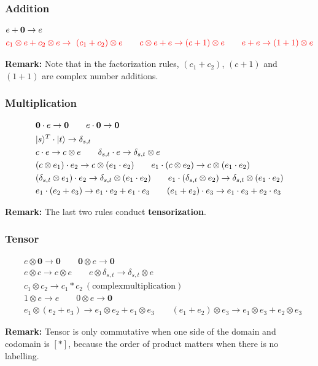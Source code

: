 \subsubsection*{Addition}
\begin{align*}
  & e + \textbf{0}\to e\\
  & \textcolor{red}{c_1 \otimes e + c_2 \otimes e \to \ (c_1 + c_2) \otimes e 
  \qquad c \otimes e + e \to (c + 1) \otimes e
  \qquad e + e \to (1 + 1) \otimes e}
\end{align*}

\textbf{Remark:} Note that in the factorization rules, $(c_1 + c_2)$, $(c + 1)$ and $(1 + 1)$ are complex number additions.


\subsubsection*{Multiplication}
\begin{align*}
  & \textbf{0} \cdot e \to \textbf{0}
  \qquad 
  e \cdot \textbf{0} \to \textbf{0}\\
  & |s\rangle^T \cdot |t\rangle \to \delta_{s, t}\\
  & c \cdot e \to c \otimes e 
  \qquad \delta_{s, t} \cdot e \to \delta_{s, t} \otimes e\\
  & (c \otimes e_1) \cdot e_2 \to c \otimes (e_1 \cdot e_2)
  \qquad e_1 \cdot (c \otimes e_2) \to c \otimes (e_1 \cdot e_2) \\
  & (\delta_{s, t} \otimes e_1) \cdot e_2 \to \delta_{s, t} \otimes (e_1 \cdot e_2)
  \qquad e_1 \cdot (\delta_{s, t} \otimes e_2) \to \delta_{s, t} \otimes (e_1 \cdot e_2) \\
  & e_1 \cdot (e_2 + e_3) \to e_1 \cdot e_2 + e_1 \cdot e_3
  \qquad (e_1 + e_2) \cdot e_3 \to e_1 \cdot e_3 + e_2 \cdot e_3
\end{align*}

\textbf{Remark: } The last two rules conduct \textbf{tensorization}.


\subsubsection*{Tensor}
\begin{align*}
  & e \otimes \textbf{0} \to \textbf{0}
  \qquad \textbf{0} \otimes e \to \textbf{0} \\
  & e \otimes c \to c \otimes e
  \qquad e \otimes \delta_{s, t} \to \delta_{s, t} \otimes e \\
  & c_1 \otimes c_2 \to c_1 * c_2\ \mathrm{(complex multiplication)}\\
  & 1 \otimes e \to e \qquad 0 \otimes e \to \mathbf{0} \\
  & e_1 \otimes (e_2 + e_3) \to e_1 \otimes e_2 + e_1 \otimes e_3
  \qquad 
  (e_1 + e_2) \otimes e_3 \to e_1 \otimes e_3 + e_2 \otimes e_3
\end{align*}

\textbf{Remark: } Tensor is only commutative when one side of the domain and codomain is $[*]$, because the order of product matters when there is no labelling.



